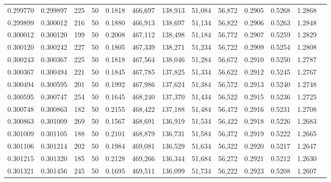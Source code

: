 \begin{tabular}{rrrrrrrrrrrrr}
0.299770 & 0.299897 &   225 &  50 &                                     0.1818 & 466,697 & 138,913 &  51,084 &  56,872 & 0.2905 & 0.5268 & 1.2868 \\
0.299899 & 0.300012 &   216 &  50 &                                     0.1880 & 466,913 & 138,697 &  51,134 &  56,822 & 0.2906 & 0.5263 & 1.2848 \\
0.300012 & 0.300120 &   199 &  50 &                                     0.2008 & 467,112 & 138,498 &  51,184 &  56,772 & 0.2907 & 0.5259 & 1.2829 \\
0.300120 & 0.300242 &   227 &  50 &                                     0.1805 & 467,339 & 138,271 &  51,234 &  56,722 & 0.2909 & 0.5254 & 1.2808 \\
0.300243 & 0.300367 &   225 &  50 &                                     0.1818 & 467,564 & 138,046 &  51,284 &  56,672 & 0.2910 & 0.5250 & 1.2787 \\
0.300367 & 0.300494 &   221 &  50 &                                     0.1845 & 467,785 & 137,825 &  51,334 &  56,622 & 0.2912 & 0.5245 & 1.2767 \\
0.300494 & 0.300595 &   201 &  50 &                                     0.1992 & 467,986 & 137,624 &  51,384 &  56,572 & 0.2913 & 0.5240 & 1.2748 \\
0.300595 & 0.300747 &   254 &  50 &                                     0.1645 & 468,240 & 137,370 &  51,434 &  56,522 & 0.2915 & 0.5236 & 1.2725 \\
0.300748 & 0.300863 &   182 &  50 &                                     0.2155 & 468,422 & 137,188 &  51,484 &  56,472 & 0.2916 & 0.5231 & 1.2708 \\
0.300863 & 0.301009 &   269 &  50 &                                     0.1567 & 468,691 & 136,919 &  51,534 &  56,422 & 0.2918 & 0.5226 & 1.2683 \\
0.301009 & 0.301105 &   188 &  50 &                                     0.2101 & 468,879 & 136,731 &  51,584 &  56,372 & 0.2919 & 0.5222 & 1.2665 \\
0.301106 & 0.301214 &   202 &  50 &                                     0.1984 & 469,081 & 136,529 &  51,634 &  56,322 & 0.2920 & 0.5217 & 1.2647 \\
0.301215 & 0.301320 &   185 &  50 &                                     0.2128 & 469,266 & 136,344 &  51,684 &  56,272 & 0.2921 & 0.5212 & 1.2630 \\
0.301321 & 0.301456 &   245 &  50 &                                     0.1695 & 469,511 & 136,099 &  51,734 &  56,222 & 0.2923 & 0.5208 & 1.2607 \\

\end{tabular}
